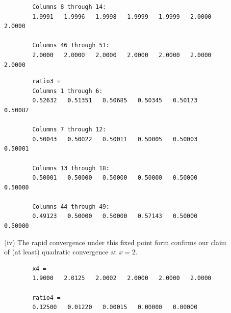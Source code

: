 \documentclass[11pt,a4paper]{article}
\begin{document}
\begin{enumerate}
\begin{enumerate}
\begin{verbatim}
		Columns 8 through 14:
		1.9991   1.9996   1.9998   1.9999   1.9999   2.0000   2.0000
		
		Columns 46 through 51:
		2.0000   2.0000   2.0000   2.0000   2.0000   2.0000   2.0000
		\end{verbatim}
	
		\begin{verbatim}
		ratio3 =
		Columns 1 through 6:
		0.52632   0.51351   0.50685   0.50345   0.50173   0.50087   

		Columns 7 through 12:
		0.50043   0.50022   0.50011   0.50005   0.50003   0.50001   

		Columns 13 through 18:
		0.50001   0.50000   0.50000   0.50000   0.50000   0.50000
		
		Columns 44 through 49:
		0.49123   0.50000   0.50000   0.57143   0.50000   0.50000
		\end{verbatim}
		\item[(iv)] The rapid convergence under this fixed point form confirms our claim of (at least) quadratic convergence at $x=2$.
		\begin{verbatim}
		x4 =
		1.9000   2.0125   2.0002   2.0000   2.0000   2.0000

		ratio4 =
		0.12500   0.01220   0.00015   0.00000   0.00000
		\end{verbatim}
	\end{enumerate}
\end{enumerate}

\pagebreak
\end{document}

